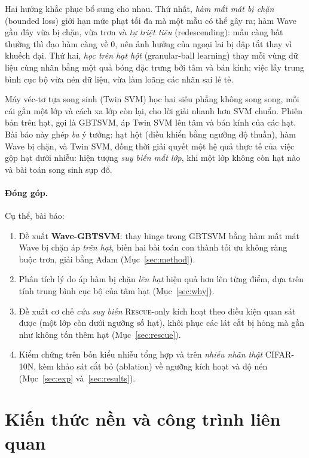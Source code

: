 \documentclass[11pt,a4paper]{article}
\newcommand{\R}{\textsc{Rescue}}
\begin{document}
Hai hướng khắc phục bổ sung cho nhau. Thứ nhất, \emph{hàm mất mát bị chặn} (bounded loss) giới hạn mức phạt tối đa mà một mẫu có thể gây ra; hàm Wave gần đây \cite{wave2024} vừa bị chặn, vừa trơn và \emph{tự triệt tiêu} (redescending): mẫu càng bất thường thì đạo hàm càng về 0, nên ảnh hưởng của ngoại lai bị dập tắt thay vì khuếch đại. Thứ hai, \emph{học trên hạt hột} (granular-ball learning) \cite{xia2019} thay mỗi vùng dữ liệu cùng nhãn bằng một quả bóng đặc trưng bởi tâm và bán kính; việc lấy trung bình cục bộ vừa nén dữ liệu, vừa làm loãng các nhãn sai lẻ tẻ.

Máy véc-tơ tựa song sinh (Twin SVM) \cite{tsvm2007} học hai siêu phẳng không song song, mỗi cái gần một lớp và cách xa lớp còn lại, cho lời giải nhanh hơn SVM chuẩn. Phiên bản trên hạt, gọi là GBTSVM, áp Twin SVM lên tâm và bán kính của các hạt. Bài báo này ghép \emph{ba} ý tưởng: hạt hột (điều khiển bằng ngưỡng độ thuần), hàm Wave bị chặn, và Twin SVM, đồng thời giải quyết một hệ quả thực tế của việc gộp hạt dưới nhiễu: hiện tượng \emph{suy biến mất lớp}, khi một lớp không còn hạt nào và bài toán song sinh sụp đổ.

\paragraph{Đóng góp.} Cụ thể, bài báo:
\begin{enumerate}
\item Đề xuất \textbf{Wave-GBTSVM}: thay hinge trong GBTSVM bằng hàm mất mát Wave bị chặn áp \emph{trên hạt}, biến hai bài toán con thành tối ưu không ràng buộc trơn, giải bằng Adam (Mục~\ref{sec:method}).
\item Phân tích lý do áp hàm bị chặn \emph{lên hạt} hiệu quả hơn lên từng điểm, dựa trên tính trung bình cục bộ của tâm hạt (Mục~\ref{sec:why}).
\item Đề xuất cơ chế \emph{cứu suy biến} \R{}-only kích hoạt theo điều kiện quan sát được (một lớp còn dưới ngưỡng số hạt), khôi phục các lát cắt bị hỏng mà gần như không tốn thêm hạt (Mục~\ref{sec:rescue}).
\item Kiểm chứng trên bốn kiểu nhiễu tổng hợp và trên \emph{nhiễu nhãn thật} CIFAR-10N, kèm khảo sát cắt bỏ (ablation) về ngưỡng kích hoạt và độ nén (Mục~\ref{sec:exp} và~\ref{sec:results}).
\end{enumerate}

\section{Kiến thức nền và công trình liên quan}
\label{sec:background}
\end{document}

